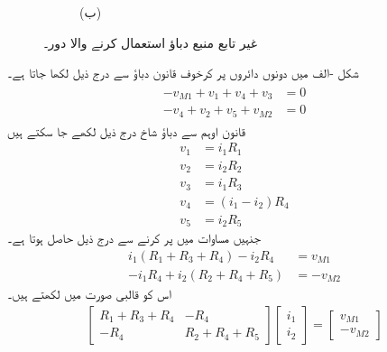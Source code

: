 \begin{figure}
\begin{subfigure}{1\textwidth}
%
\caption*{(ب)}
\end{subfigure}%
\caption{غیر تابع منبع دباؤ استعمال کرنے والا دور۔}
\label{شکل_جوڑ_آزاد_منبع_دباو_دائری_مثال}
\end{figure}%

شکل -الف میں دونوں دائروں پر کرخوف قانون دباؤ سے درج ذیل لکھا جاتا ہے۔
\begin{gather}
\begin{aligned}\label{مساوات_جوڑ_دائری_آزاد_منبع_الف}
-v_{M1}+v_1+v_4+v_3&=0\\
-v_4+v_2+v_5+v_{M2}&=0
\end{aligned}
\end{gather}
قانون اوہم سے دباؤ شاخ درج ذیل لکھے جا سکتے ہیں
\begin{align*}
v_1&=i_1 R_1\\
v_2&=i_2 R_2\\
v_3&=i_1 R_3\\
v_4&=(i_1-i_2)R_4\\
v_5&=i_2 R_5
\end{align*}
جنہیں مساوات  میں پر کرنے سے درج ذیل حاصل ہوتا ہے۔
\begin{align*}
i_1(R_1+R_3+R_4)-i_2 R_4&=v_{M1}\\
-i_1 R_4+i_2(R_2+R_4+R_5)&=-v_{M2}
\end{align*}
اس کو قالبی صورت میں لکھتے ہیں۔
\begin{align}
\begin{bmatrix}
R_1+R_3+R_4 & -R_4\\
-R_4& R_2+R_4+R_5
\end{bmatrix}
\begin{bmatrix}
i_1\\
i_2
\end{bmatrix}
=
\begin{bmatrix}
v_{M1}\\-v_{M2}
\end{bmatrix}
\end{align}

